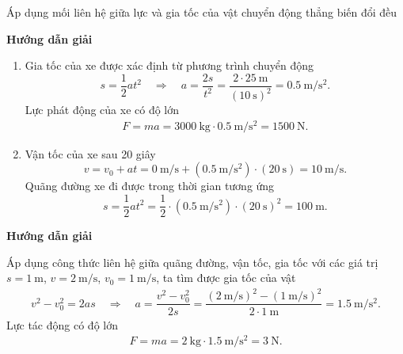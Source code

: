\begin{dang}{Áp dụng mối liên hệ giữa lực và gia tốc của vật chuyển động thẳng biến đổi đều}
	{	\begin{center}
			\textbf{Hướng dẫn giải}
		\end{center}
		
		\begin{enumerate}[label=\alph*.]
			\item Gia tốc của xe được xác định từ phương trình chuyển động 
				$$s=\dfrac{1}{2}at^{2}\quad\Rightarrow\quad a=\dfrac{2s}{t^2}=\dfrac{2\cdot\SI{25}{\meter}}{(\SI{10}{\second})^{2}}=\SI{0.5}{\meter/\second^{2}}.$$
			Lực phát động của xe có độ lớn 
				\begin{align*}
					F=ma=\SI{3000}{\kilogram}\cdot\SI{0.5}{\meter/\second^2}=\SI{1500}{\newton}.
				\end{align*}
			\item Vận tốc của xe sau 20 giây 			$$v=v_0+at=\SI{0}{\meter/\second}+(\SI{0.5}{\meter/\second^2})\cdot(\SI{20}{\second})=\SI{10}{\meter/\second}.$$
			Quãng đường xe đi được trong thời gian tương ứng
			$$s=\dfrac{1}{2}at^2=\dfrac{1}{2}\cdot(\SI{0.5}{\meter/\second^2})\cdot(\SI{20}{\second})^2=\SI{100}{\meter}.$$  
		\end{enumerate}	
		
	}
	{	\begin{center}
			\textbf{Hướng dẫn giải}
		\end{center}
		Áp dụng công thức liên hệ giữa quãng đường, vận tốc, gia tốc với các giá trị $s= \SI{1}{\meter}$, $v= \SI{2}{\meter/\second}$, $v_0=\SI{1}{\meter/\second}$, ta tìm được gia tốc của vật 
			\begin{align*}
				v^2-v_0^2=2as \quad\Rightarrow\quad a=\dfrac{v^2-v_0^2}{2s}=\dfrac{(\SI{2}{\meter/\second})^2-(\SI{1}{\meter/\second})^2}{2\cdot\SI{1}{\meter}}=\SI{1.5}{\meter/\second^2}.
			\end{align*}
		Lực tác động có độ lớn 
			\begin{align*}
				F=ma=\SI{2}{\kilogram}\cdot\SI{1.5}{\meter/\second^2}=\SI{3}{\newton}.
			\end{align*}		
	}
\end{dang}